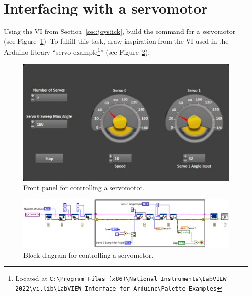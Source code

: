 \documentclass{labo}
\begin{document}
\section{Interfacing with a servomotor}
Using the VI from Section~\ref{sec:joystick}, build the command for a servomotor (see Figure~\ref{fig:servo-control}).
To fulfill this task, draw inspiration from the VI used in the Arduino library ``servo example\footnote{Located at \texttt{C:\textbackslash Program Files (x86)\textbackslash National Instruments\textbackslash LabVIEW 2022\textbackslash vi.lib\textbackslash LabVIEW Interface for Arduino\textbackslash Palette Examples}}'' (see Figure~\ref{fig:servo-block}).

\begin{figure}[ht!]
  \centering
  \includegraphics[width=.9\textwidth]{front-panel-servo.png}
  \caption{Front panel for controlling a servomotor.}
  \label{fig:servo-control}
\end{figure}

\begin{figure}[ht!]
  \centering
  \includegraphics[width=\textwidth]{block-diagram-servo.png}
  \caption{Block diagram for controlling a servomotor.}
  \label{fig:servo-block}
\end{figure}




\end{document}
